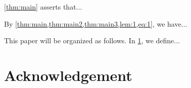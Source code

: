 \documentclass[11pt,a4paper,oneside,lualatex]{article}
\numberwithin{equation}{section} %
\begin{document}
\cref{thm:main} asserts that...

By \cref{thm:main,thm:main2,thm:main3,lem:1,eq:1}, we have...

\vspace{1em}

This paper will be organized as follows. 
In \cref{sec:2}, we define...


\section*{Acknowledgement} \label{sec:acknowledgement}




\section{} \label{sec:2}








\end{document}
